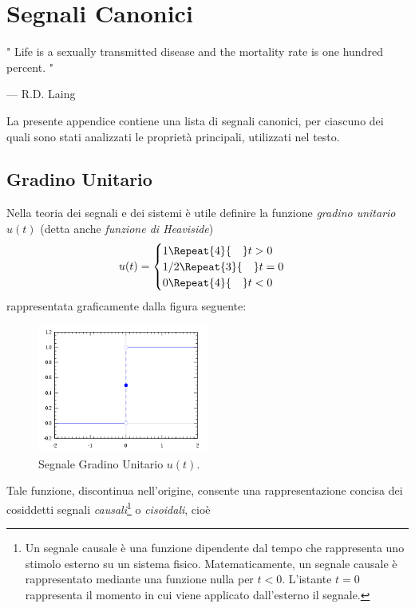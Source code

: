\documentclass[12pt,oneside,openany]{memoir}
\numberwithin{equation}{subsection}
\newcommand{\quads}[1]{\Repeat{#1}{\quad}}
\begin{document}
\chapter{Segnali Canonici}
\epigraph{"
	Life is a sexually transmitted disease and the mortality rate is one
	hundred percent.
"}{--- \textup{R.D. Laing}}
La presente appendice contiene una lista di segnali canonici, per ciascuno dei
quali sono stati analizzati le propriet\`a principali, utilizzati nel testo.


\section{Gradino Unitario}
Nella teoria dei segnali e dei sistemi \`e utile definire la funzione
\textit{gradino unitario} $u(t)$ (detta anche \textit{funzione di Heaviside})
\begin{equation}
	u(t) =
		\begin{cases}
			1 \quads{4} t > 0\\
			1/2 \quads{3} t = 0\\
			0 \quads{4} t < 0
		\end{cases}
\end{equation}
rappresentata graficamente dalla figura seguente:
\begin{figure}[H]
	\centering
	\captionsetup{justification=centering}
	\includegraphics[width=0.5\textwidth]{images/heaviside_function.png}
	\caption{Segnale Gradino Unitario $u(t)$.}
\end{figure}
Tale funzione, discontinua nell'origine, consente una rappresentazione concisa
dei cosiddetti segnali \textit{causali}\footnote{Un segnale causale \`e una
funzione dipendente dal tempo che rappresenta uno stimolo esterno su un sistema
fisico. Matematicamente, un segnale causale \`e rappresentato mediante una
funzione nulla per $t < 0$. L'istante $t = 0$ rappresenta il momento in cui
viene applicato dall'esterno il segnale.} o \textit{cisoidali}, cio\`e
\end{document}
